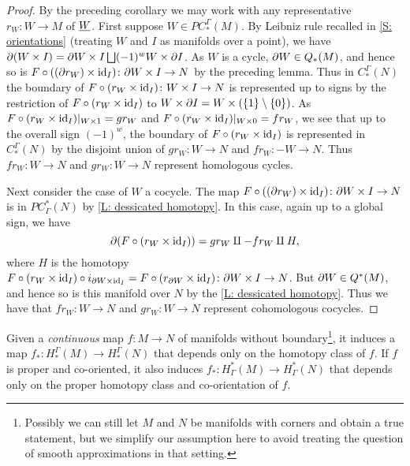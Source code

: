 \begin{proof}
	By the preceding corollary we may work with any representative $r_W \colon W \to M$ of $\underline{W}$.
	First suppose $W \in PC_*^\Gamma(M)$.
	By Leibniz rule recalled in \cref{S: orientations} (treating $W$ and $I$ as manifolds over a point), we have $\partial (W \times I) = \partial W \times I \bigsqcup (-1)^{w} W \times \partial I$.
	As $W$ is a cycle, $\partial W \in Q_*(M)$, and hence so is $F \circ ((\partial r_W) \times \mathrm{id}_I) \colon \partial W \times I \to N$ by the preceding lemma.
	Thus in $C^\Gamma_*(N)$ the boundary of $F \circ (r_W \times \mathrm{id}_I) \colon W \times I \to N$ is represented up to signs by the restriction of
	$F \circ (r_W \times \mathrm{id}_I)$ to $W \times \partial I = W \times (\{1\} \setminus \{0\})$.
	As $F \circ (r_W \times \mathrm{id}_I)|_{W \times 1} = gr_W$ and $F \circ (r_W \times \mathrm{id}_I)|_{W \times 0} = fr_W$, we see that up to the overall sign $(-1)^{w}$, the boundary of $F \circ (r_W \times \mathrm{id}_I)$ is represented in $C_*^\Gamma(N)$ by the disjoint union of $gr_W \colon W \to N$ and $fr_W \colon -W \to N$.
	Thus $fr_W \colon W \to N$ and $gr_W \colon W \to N$ represent homologous cycles.

	Next consider the case of $W$ a cocycle.
	The map $F \circ ((\partial r_W) \times \mathrm{id}_I) \colon \partial W \times I \to N$ is in $PC^*_\Gamma(N)$ by \cref{L: dessicated homotopy}.
	In this case, again up to a global sign, we have $$\partial (F \circ (r_W \times \mathrm{id}_I)) = gr_W \amalg -fr_W \amalg H,$$ where $H$ is the homotopy $F \circ (r_W \times \mathrm{id}_I) \circ i_{\partial W \times \mathrm{id}_I} = F \circ (r_{\partial W} \times \mathrm{id}_I) \colon \partial W \times I \to N$.
	But $\partial W \in Q^*(M)$, and hence so is this manifold over $N$ by the \cref{L: dessicated homotopy}.
	Thus we have
	that $fr_W \colon W \to N$ and $gr_W \colon W \to N$ represent cohomologous cocycles.
\end{proof}

\begin{proposition}\label{P: homology homotopy functor}
	Given a \textit{continuous} map $f \colon M \to N$ of manifolds without boundary\footnote{Possibly we can still let $M$ and $N$ be manifolds with corners and obtain a true statement, but we simplify our assumption here to avoid treating the question of smooth approximations in that setting.}, it induces a map $f_* \colon H_*^\Gamma(M) \to H_*^\Gamma(N)$ that depends only on the homotopy class of $f$.
	If $f$ is proper and co-oriented, it also induces $f_* \colon H^*_\Gamma(M) \to H^*_\Gamma(N)$ that depends only on the proper homotopy class and co-orientation of $f$.
\end{proposition}

